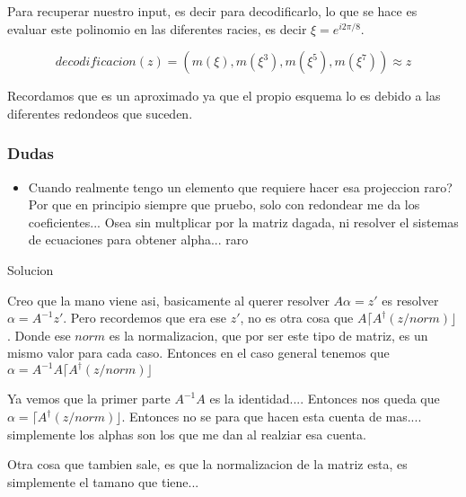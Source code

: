 \documentclass[12pt, oneside]{article}
\begin{document}
Para recuperar nuestro input, es decir para decodificarlo, lo que se hace es
evaluar este polinomio en las diferentes racies, es decir $\xi=e^{i2\pi/8 }$.

\begin{equation*}
    decodificacion(z) = ( m(\xi), m(\xi^3), m(\xi^5), m(\xi^7)) \approx z
\end{equation*}

Recordamos que es un aproximado ya que el propio esquema lo es debido a las diferentes
redondeos que suceden.

\subsubsection{Dudas}
\begin{itemize}
  \item Cuando realmente tengo un elemento que requiere hacer esa projeccion raro? Por que en principio siempre que pruebo, solo con redondear me da los coeficientes...
  Osea sin multplicar por la matriz dagada, ni resolver el sistemas de ecuaciones para obtener alpha... raro
\end{itemize}
Solucion

Creo que la mano viene asi, basicamente al querer resolver $A\alpha=z'$ es resolver $\alpha=A^{-1}z'$. 
Pero recordemos que era ese $z'$, no es otra cosa que $A\lceil A^{\dagger}(z/norm)\rfloor$.
Donde ese $norm$ es la normalizacion, que por ser este tipo de matriz, es un mismo valor para cada caso.
Entonces en el caso general tenemos que $\alpha=A^{-1}A\lceil A^{\dagger}(z/norm)\rfloor$

Ya vemos que la primer parte $A^{-1}A$ es la identidad....
Entonces nos queda que $\alpha=\lceil A^{\dagger}(z/norm)\rfloor$.
Entonces no se para que hacen esta cuenta de mas.... simplemente los alphas son 
los que me dan al realziar esa cuenta.

Otra cosa que tambien sale, es que la normalizacion de la matriz esta, es simplemente el tamano que tiene...
\end{document}
